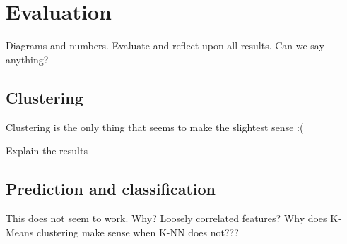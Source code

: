 \section{Evaluation}
\label{sec:evaluation}
Diagrams and numbers. Evaluate and reflect upon all results. Can we say anything?

\subsection{Clustering}
\label{subsec:clustering}

Clustering is the only thing that seems to make the slightest sense :(

Explain the results

\subsection{Prediction and classification}
\label{subsec:predictclassify}

This does not seem to work. Why? Loosely correlated features? Why does K-Means clustering make sense when K-NN does not???